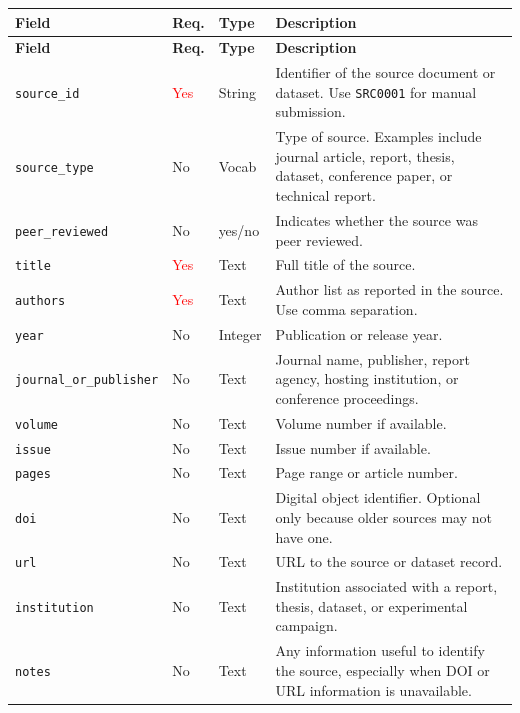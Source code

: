 \documentclass[11pt]{book}
\begin{document}
\begin{longtable}{p{}p{}p{}p{}}
\hline
\textbf{Field} & \textbf{Req.} & \textbf{Type} & \textbf{Description} \\
\hline
\endfirsthead

\hline
\textbf{Field} & \textbf{Req.} & \textbf{Type} & \textbf{Description} \\
\hline
\endhead

\hline
\endfoot

\texttt{source\_id} & \textcolor{red}{Yes} & String & Identifier of the source document or dataset. Use \texttt{SRC0001} for manual submission. \\

\texttt{source\_type} & No & Vocab & Type of source. Examples include journal article, report, thesis, dataset, conference paper, or technical report. \\

\texttt{peer\_reviewed} & No & yes/no & Indicates whether the source was peer reviewed. \\

\texttt{title} & \textcolor{red}{Yes} & Text & Full title of the source. \\

\texttt{authors} & \textcolor{red}{Yes} & Text & Author list as reported in the source. Use comma separation. \\

\texttt{year} & No & Integer & Publication or release year. \\

\texttt{journal\_or\_publisher} & No & Text & Journal name, publisher, report agency, hosting institution, or conference proceedings. \\

\texttt{volume} & No & Text & Volume number if available. \\

\texttt{issue} & No & Text & Issue number if available. \\

\texttt{pages} & No & Text & Page range or article number. \\

\texttt{doi} & No & Text & Digital object identifier. Optional only because older sources may not have one. \\

\texttt{url} & No & Text & URL to the source or dataset record. \\

\texttt{institution} & No & Text & Institution associated with a report, thesis, dataset, or experimental campaign. \\

\texttt{notes} & No & Text & Any information useful to identify the source, especially when DOI or URL information is unavailable. \\

\end{longtable}
\end{document}
